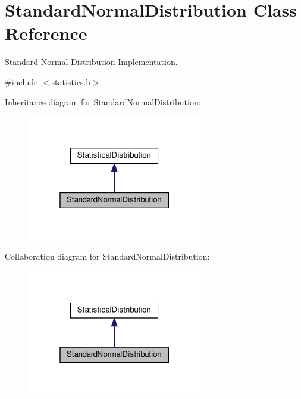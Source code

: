 \hypertarget{classStandardNormalDistribution}{}\section{Standard\+Normal\+Distribution Class Reference}
\label{classStandardNormalDistribution}


Standard Normal Distribution Implementation.  




{\ttfamily \#include $<$statistics.\+h$>$}



Inheritance diagram for Standard\+Normal\+Distribution\+:\nopagebreak
\begin{figure}[H]
\begin{center}
\leavevmode
\includegraphics[width=217pt]{classStandardNormalDistribution__inherit__graph}
\end{center}
\end{figure}


Collaboration diagram for Standard\+Normal\+Distribution\+:\nopagebreak
\begin{figure}[H]
\begin{center}
\leavevmode
\includegraphics[width=217pt]{classStandardNormalDistribution__coll__graph}
\end{center}
\end{figure}

